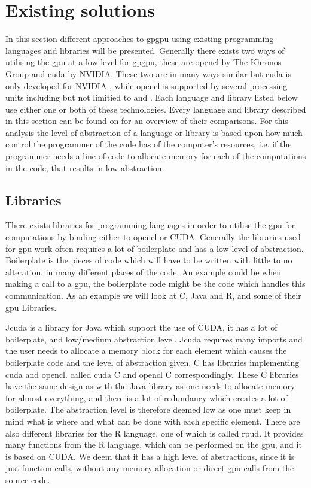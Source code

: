 \section{Existing solutions} %
\label{sec:state_of_the_art}
In this section different approaches to \acrshort{gpgpu} using existing programming languages and libraries will be presented.
Generally there exists two ways of utilising the \acrshort{gpu} at a low level for \acrshort{gpgpu}, these are \gls{opencl} by The Khronos Group and \gls{cuda} by NVIDIA.
These two are in many ways similar but \gls{cuda} is only developed for NVIDIA , while \gls{opencl} is supported by several processing units including but not limitied to  and .
Each language and library listed below use either one or both of these technologies.
Every language and library described in this section can be found on  for an overview of their comparisons.
For this analysis the level of abstraction of a language or library is based upon how much control the programmer of the code has of the computer's resources, i.e. if the programmer needs a line of code to allocate memory for each of the computations in the code, that results in low abstraction.
      
\subsection{Libraries} 
There exists libraries for programming languages in order to utilise the \acrshort{gpu} for computations by binding either to \gls{opencl} or CUDA.
Generally the libraries used for \acrshort{gpu} work often requires a lot of boilerplate and has a low level of abstraction.
Boilerplate is the pieces of code which will have to be written with little to no alteration, in many different places of the code.
An example could be when making a call to a \acrshort{gpu}, the boilerplate code might be the code which handles this communication.
As an example we will look at C, Java and R, and some of their \acrshort{gpu} Libraries.

Jcuda is a library for Java which support the use of CUDA, it has a lot of boilerplate, and low/medium abstraction level. \citep{Java_library}
Jcuda requires many imports and the user needs to allocate a memory block for each element which causes the boilerplate code and the level of abstraction given. \citep{Java_malloc}
C has libraries implementing \gls{cuda} and \gls{opencl}. called \gls{cuda} C and \gls{opencl} C correspondingly.
These C libraries have the same design as with the Java library as one needs to allocate memory for almost everything, and there is a lot of redundancy which creates a lot of boilerplate. 
The abstraction level is therefore deemed low as one must keep in mind what is where and what can be done with each specific element. \citep{C_CUDA} 
There are also different libraries for the R language, one of which is called rpud.
It provides many functions from the R language, which can be performed on the \acrshort{gpu}, and it is based on CUDA.
We deem that it has a high level of abstractions, since it is just function calls, without any memory allocation or direct \acrshort{gpu} calls from the source code. \citep{Rcuda} 

